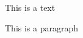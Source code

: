 \documentclass{article}
\begin{document}
This is a text
\flushright
\par
This is a paragraph
\end{document}
